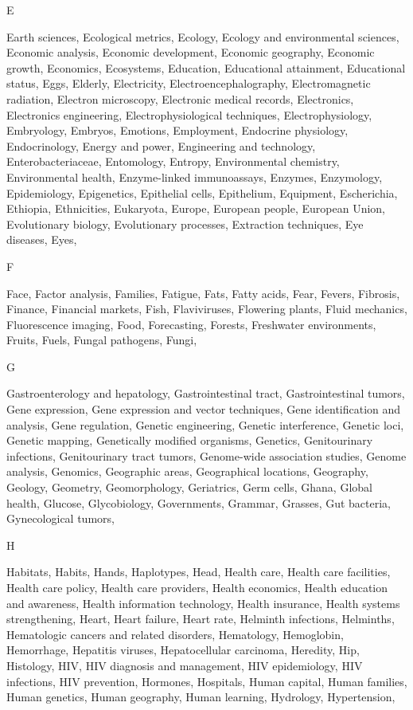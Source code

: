 E

Earth sciences, Ecological metrics, Ecology, Ecology and environmental sciences, Economic analysis, Economic development, Economic geography, Economic growth, Economics, Ecosystems, Education, Educational attainment, Educational status, Eggs, Elderly, Electricity, Electroencephalography, Electromagnetic radiation, Electron microscopy, Electronic medical records, Electronics, Electronics engineering, Electrophysiological techniques, Electrophysiology, Embryology, Embryos, Emotions, Employment, Endocrine physiology, Endocrinology, Energy and power, Engineering and technology, Enterobacteriaceae, Entomology, Entropy, Environmental chemistry, Environmental health, Enzyme-linked immunoassays, Enzymes, Enzymology, Epidemiology, Epigenetics, Epithelial cells, Epithelium, Equipment, Escherichia, Ethiopia, Ethnicities, Eukaryota, Europe, European people, European Union, Evolutionary biology, Evolutionary processes, Extraction techniques, Eye diseases, Eyes, 

F

Face, Factor analysis, Families, Fatigue, Fats, Fatty acids, Fear, Fevers, Fibrosis, Finance, Financial markets, Fish, Flaviviruses, Flowering plants, Fluid mechanics, Fluorescence imaging, Food, Forecasting, Forests, Freshwater environments, Fruits, Fuels, Fungal pathogens, Fungi, 

G

Gastroenterology and hepatology, Gastrointestinal tract, Gastrointestinal tumors, Gene expression, Gene expression and vector techniques, Gene identification and analysis, Gene regulation, Genetic engineering, Genetic interference, Genetic loci, Genetic mapping, Genetically modified organisms, Genetics, Genitourinary infections, Genitourinary tract tumors, Genome-wide association studies, Genome analysis, Genomics, Geographic areas, Geographical locations, Geography, Geology, Geometry, Geomorphology, Geriatrics, Germ cells, Ghana, Global health, Glucose, Glycobiology, Governments, Grammar, Grasses, Gut bacteria, Gynecological tumors, 

H

Habitats, Habits, Hands, Haplotypes, Head, Health care, Health care facilities, Health care policy, Health care providers, Health economics, Health education and awareness, Health information technology, Health insurance, Health systems strengthening, Heart, Heart failure, Heart rate, Helminth infections, Helminths, Hematologic cancers and related disorders, Hematology, Hemoglobin, Hemorrhage, Hepatitis viruses, Hepatocellular carcinoma, Heredity, Hip, Histology, HIV, HIV diagnosis and management, HIV epidemiology, HIV infections, HIV prevention, Hormones, Hospitals, Human capital, Human families, Human genetics, Human geography, Human learning, Hydrology, Hypertension, 

